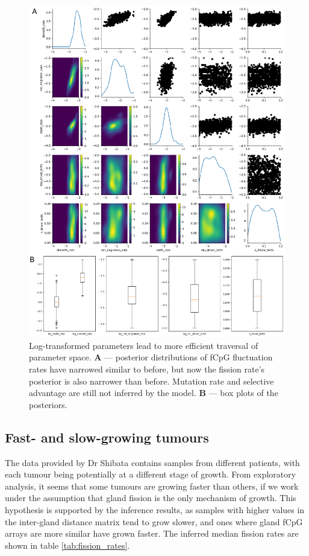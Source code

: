 \begin{figure}[h]
    \centering
    \includegraphics[width=\textwidth]{Chapter_5/figures/inference_raw/inference_S.pdf}
    \caption{Log-transformed parameters lead to more efficient traversal of
    parameter space. \textbf{A} --- posterior distributions of fCpG fluctuation
    rates have narrowed similar to before, but now the fission rate's posterior
    is also narrower than before. Mutation rate and selective advantage are
    still not inferred by the model. \textbf{B} --- box plots of the
    posteriors.}
    \label{fig:inference_2}
\end{figure}
\clearpage

\subsection{Fast- and slow-growing tumours}
The data provided by Dr Shibata contains samples from different patients, with
each tumour being potentially at a different stage of growth. From exploratory
analysis, it seems that some tumours are growing faster than others, if we work
under the assumption that gland fission is the only mechanism of growth. This
hypothesis is supported by the inference results, as samples with higher values
in the inter-gland distance matrix tend to grow slower, and ones where gland
fCpG arrays are more similar have grown faster. The inferred median fission
rates are shown in table \ref{tab:fission_rates}.

